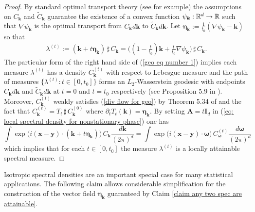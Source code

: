 \documentclass[10pt,noinfoline]{imsart}
\newcommand{\bs}{\boldsymbol}
\begin{document}
\begin{proof}
By standard optimal transport theory (see \cite{villani2003topics} for example) the assumptions on $C_{\bs k}$ and $\tilde C_{\bs k}$ guarantee the existence of a convex function $\psi_{\bs k}:\Bbb R^d \rightarrow \Bbb R$ such that $\nabla \psi_{\bs k}$ is the optimal transport from $C_{\bs k}d\bs k$ to $\tilde C_{\bs k}d\bs k$.  Let $\bs \eta_{\bs k}:= \frac{1}{t_0}(\nabla \psi_{\bs k}-\bs k)$ so that
\begin{align}
\label{geo eq number 1}
\lambda^{(t)}:=(\bs k + t\bs\eta_{\bs k})\,\sharp\, C_{\bs k} = \big((1-\textstyle\frac{t}{t_0})\bs k + \textstyle\frac{t}{t_0}\nabla\psi_{\bs k}\big)\,\sharp\, C_{\bs k}. 
\end{align}
The particular form of the right hand side of (\ref{geo eq number 1})  implies each measure $\lambda^{(t)}$ has a density $C_{\bs k}^{(t)}$ with respect to Lebesgue measure and the path of measures $\{\lambda^{(t)}\colon t\in[0,t_0] \}$ forms an $L_2$-Wasserstein geodesic with endpoints $C_{\bs k}d\bs k$ and $\tilde C_{\bs k}d\bs k$ at $t=0$ and $t=t_0$ respectively (see Proposition 5.9 in \cite{villani2003topics}). Moreover, $C^{(t)}_{\bs k}$ weakly satisfies (\ref{div flow for geo}) by Theorem 5.34 of \cite{villani2003topics} and the fact that $C^{(t)}_{\bs k} = T_t\,\sharp\, C^{(0)}_{\bs k}$ where $\partial_t T_t(\bs k) = \bs \eta_{\bs k}$.
By  setting $\bs A=t\bs I_d$ in (\ref{eq: local spectral density for nonstationary phase}) one has
\[
\int  \exp\!\big(i(\bs x-\bs y)\!\cdot\! (\bs k + t\bs\eta_{\bs k})\big)\, C_{\bs k}\frac{d\bs k}{(2\pi)^d} 
=\int \exp\!\big(i(\bs x-\bs y)\!\cdot\! \bs\omega\big)\,  C^{(t)}_{\bs \omega}\frac{d\bs \omega}{(2\pi)^d}
\]
which implies that for each $t\in[0,t_0]$ the measure $\lambda^{(t)}$ is a locally attainable spectral measure.
\end{proof}

Isotropic spectral densities are an important special case for many statistical applications. The following claim allows considerable simplification for the construction of the vector field $\bs \eta_{\bs k}$ guaranteed by Claim \ref{claim any two spec are attainable}.
\end{document}
